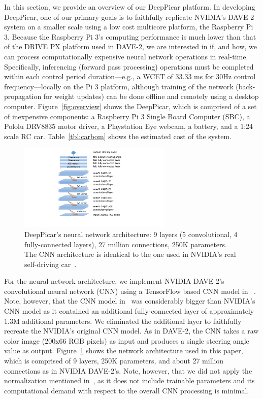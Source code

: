 In this section, we provide an overview of our DeepPicar platform.
In developing DeepPicar, one of our primary goals is to faithfully
replicate NVIDIA's DAVE-2 system on a smaller scale using a low cost
multicore platform, the Raspberry Pi 3. Because the Raspberry Pi 3's
computing performance is much lower than that of the DRIVE PX platform
used in DAVE-2, we are interested in if, and how, we can process
computationally expensive neural network operations in
real-time. Specifically, inferencing (forward pass processing)
operations must be completed within each control period
duration---e.g., a WCET of 33.$\overline{\mbox{33}}$ ms for 30Hz control 
frequency---locally on the Pi 3 platform, although training of the 
network (back-propagation for weight updates) can be done offline and 
remotely using a desktop computer.
Figure~\ref{fig:overview} shows the DeepPicar, which is comprised of a
set of inexpensive components: a Raspberry Pi 3 Single Board Computer
(SBC), a Pololu DRV8835 motor driver, a Playstation Eye webcam, a
battery, and a 1:24 scale RC car. Table~\ref{tbl:carbom} shows the
estimated cost of the system.

\begin{figure}[h]
  \centering
  \includegraphics[width=0.65\textwidth]{figs/architecture}
  \caption{DeepPicar's neural network architecture: 9 layers (5
    convolutional, 4 fully-connected layers), 27 million connections,
    250K parameters. The CNN architecture is identical to the one 
	used in NVIDIA's real self-driving car~\cite{Bojarski2016}.}
  \label{fig:architecture}
\end{figure}


For the neural network architecture, we implement
NVIDIA DAVE-2's convolutional neural network (CNN) using a TensorFlow
based CNN model in ~\cite{deeptesla}. Note, however, that the CNN model
in~\cite{deeptesla} was considerably bigger than NVIDIA's CNN model as
it contained an additional fully-connected layer of approximately 1.3M
additional parameters. We eliminated the additional layer to
faithfully recreate the NVIDIA's original CNN model.
As in DAVE-2, the CNN takes a raw color image (200x66 RGB pixels)
as input and produces a single steering angle value as
output. Figure~\ref{fig:architecture} shows the network architecture
used in this paper, which is comprised of 9 layers, 250K parameters,
and about 27 million connections as in NVIDIA DAVE-2's. Note, however,
that we did not apply the normalization mentioned
in~\cite{Bojarski2016}, as it does not include trainable parameters
and its computational demand with respect to the overall CNN
processing is minimal.

